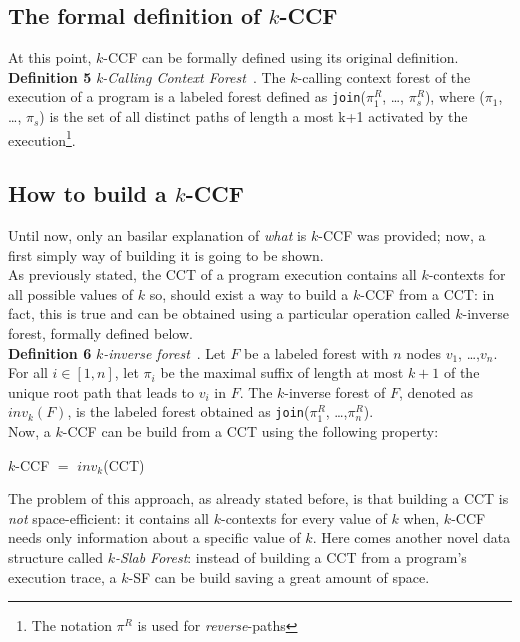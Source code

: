 \documentclass[a4paper,11pt]{report}
\begin{document}
\subsection{The formal definition of $k$-CCF}

At this point, $k$-CCF can be formally defined using its original definition.\\

\textbf{Definition 5} \emph{k-Calling Context Forest}~\cite{kccf}. The $k$-calling context
forest of the execution of a program is a labeled forest defined as 
\texttt{join}($\pi_1^R$, \ldots, $\pi_s^R$), where ($\pi_1$, \ldots, $\pi_s$) is the set of
all distinct paths of length a most k+1 activated by the execution\footnote{The notation $\pi^R$ is used for \emph{reverse}-paths}.

\subsection{How to build a $k$-CCF}

Until now, only an basilar explanation of \emph{what} is $k$-CCF was provided; 
now, a first simply way of building it is going to be shown.\\
As previously stated, the CCT of a program execution contains all $k$-contexts for
all possible values of $k$ so, should exist a way to build a $k$-CCF from a CCT: in fact, this is true and can be obtained using a particular operation called $k$-inverse forest, formally defined below.\\

\textbf{Definition 6} \emph{$k$-inverse forest}~\cite{kccf}. Let $F$ be a labeled forest with $n$ nodes
$v_1$, \ldots ,$v_n$. For all $i \in [1,n]$, let $\pi_i$ be the maximal suffix of length at most $k+1$ of the unique root path that leads to $v_i$ in $F$. The $k$-inverse forest of $F$, denoted as $inv_k(F)$, is the labeled forest obtained as \texttt{join}($\pi_1^R$, \ldots ,$\pi_n^R$).\\[20pt]
Now, a $k$-CCF can be build from a CCT using the following property:
\begin{center}
$k$-CCF $=$ $inv_k$(CCT)
\end{center}

The problem of this approach, as already stated before, is that building a CCT 
is \emph{not} space-efficient: it contains all $k$-contexts for every value of $k$ when,
$k$-CCF needs only information about a specific value of $k$. 
Here comes another novel data structure called \emph{$k$-Slab Forest}: 
instead of building a CCT from a program's execution trace, a $k$-SF can be build saving a great amount of space.\\
\end{document}
